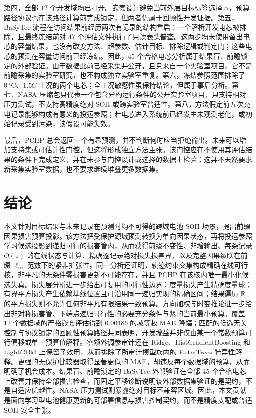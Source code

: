 \documentclass[UTF8,11pt]{ctexart}
\newcommand{\R}{\mathbb{R}}
\begin{document}
第四，全部 $12$ 个开发域均已打开。嵌套设计避免当前外层目标标签选择 $\alpha$，预算路径协议也在该路径计算前完成锁定，但两者仍属于回顾性开发证据。第五，BaSyTec 流程在访问结果前经历两次有记录的结构重启：一个解析开发电芯被排除，且最终冻结前对 $47$ 个评估文件执行了只读表头普查。这两步均未使用留出电芯的容量结果，也没有改变方法、超参数、估计目标、排除逻辑或判定门；这些电芯的预测在容量访问前已经冻结。因此，$45$ 个合格电芯分析属于结果盲、前瞻锁定的外部验证。由于数据此前已经采集并公开，且只来自一个实验室项目，它不是前瞻采集的实验室研究，也不构成独立实验室重复。第六，冻结参照范围排除了 $0\,^{\circ}\mathrm{C}$、$1.5C$ 工况的两个电芯；全工况敏感性虽保持结论，但属于事后分析。第七，NASA 压缩包只代表一个包含异构运行条件的公开实验室项目，只支持相对压力测试，不支持高精度绝对 SOH 或跨实验室普适性。第八，方法假定前五次充电记录能够构成有意义的投运参照；若电芯进入系统前已经发生未观测老化，或初始记录受到污染，该假设可能失效。

最后，PCHP 总会返回一个有界预测，并不判断何时应当拒绝输出。未来可以增加支持集或可估计性门控，但这将形成独立方法主张。该门控应在不使用其评估结果的条件下完成定义，并在未参与门控设计或选择的数据上检验；这并不天然要求新采集实验室数据，也不要求继续堆叠更多数据集。

\section{结论}

本文针对目标结果与未来记录在预测时均不可得的跨域电池 SOH 场景，提出前缀因果损害预算投影。该方法把受保护源域预测转换为单向因果状态，再将投运参照学习候选投影到递归可行的损害管内，从而获得前缀不变性、非增输出、每条记录 $O(1)$ 的在线状态与计算、精确逐记录绝对损失损害界，以及完整因果级联在前缀 $\ell_\infty$ 范数下的紧非扩张性。同一分析还证明，轨迹约束交集构成精确在线可行核，非平凡的无条件零损害更新不可能存在，并且 PCHP 在该核内唯一最小化候选失真。损失层分析进一步给出可复用的可行性边界：度量损失产生精确度量球；有界平方损失产生依赖基线位置且可沿用同一递归实现的精确区间；结果遍历 $\R$ 的平方损失则不允许任何非平凡有限结果一致预算。方向加权与时变推论进一步给出非对称损害管、下端点递归可行性的必要充分条件与紧的当前最小预算。覆盖 $12$ 个数据域的严格嵌套评估得到 $0.00486$ 的域等权 MAE 降幅；匹配的候选无关控制与协议锁定的回顾性预算路径共同表明，开发增益并非仅由某一个常数预算可行偏移或单一预算值解释。零额外调参审计还在 Ridge、HistGradientBoosting 和 LightGBM 上保留了效用，从而排除了所审计模型族内的 ExtraTrees 特异性解释。更强的无保护比较器取得显著更低的 MAE，却违反每个数据域的预算，从而明确了机会成本。结果盲、前瞻锁定的 BaSyTec 外部验证在全部 $45$ 个合格电芯上改善并保持全部损害检查，而固定平移诊断说明该外部数据集验证的是契约，不是自适应优越性。NASA 压力测试则暴露绝对目标不兼容区域。因此，本文贡献是面向学习型电池健康更新的可部署信息与损害控制契约，而不是精度支配或普适 SOH 安全主张。
\end{document}
